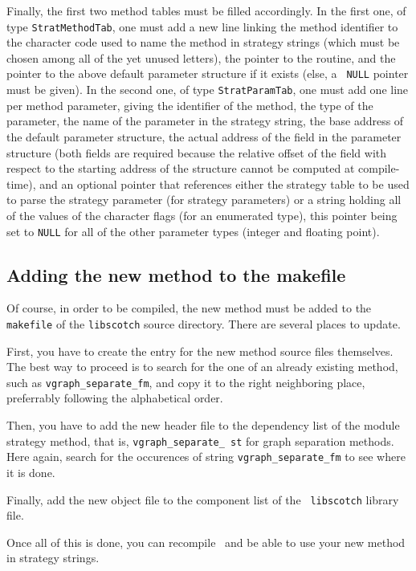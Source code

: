 Finally, the first two method tables must be filled accordingly. In the
first one, of type {\tt Strat\lbt Method\lbt Tab}, one must add a new
line linking the method identifier to the character code used to name
the method in strategy strings (which must be chosen among all of
the yet unused letters), the pointer to the routine, and the pointer
to the above default parameter structure if it exists (else, a {\tt
NULL} pointer must be given).
In the second one, of type {\tt Strat\lbt Param\lbt Tab}, one must add
one line per method parameter, giving the identifier of the method,
the type of the parameter, the name of the parameter in the strategy
string, the base address of the default parameter structure, the
actual address of the field in the parameter structure (both fields
are required because the relative offset of the field with respect to
the starting address of the structure cannot be computed at
compile-time), and an optional pointer that references either the
strategy table to be used to parse the strategy parameter (for
strategy parameters) or a string holding all of the values of the
character flags (for an enumerated type), this pointer being set to
{\tt NULL} for all of the other parameter types (integer and floating
point).

\subsection{Adding the new method to the makefile}

Of course, in order to be compiled, the new method must be added to
the {\tt makefile} of the {\tt libscotch} source directory. There are
several places to update.

First, you have to create the entry for the new method source files
themselves. The best way to proceed is to search for the one of an
already existing method, such as {\tt vgraph\_\lbt separate\_\lbt fm},
and copy it to the right neighboring place, preferrably following the
alphabetical order.

Then, you have to add the new header file to the dependency list of
the module strategy method, that is, {\tt vgraph\_\lbt separate\_\lbt
st} for graph separation methods. Here again, search for the
occurences of string {\tt vgraph\_\lbt separate\_\lbt fm} to see where
it is done.

Finally, add the new object file to the component list of the {\tt
libscotch} library file.

Once all of this is done, you can recompile \scotch\ and be able to
use your new method in strategy strings.
